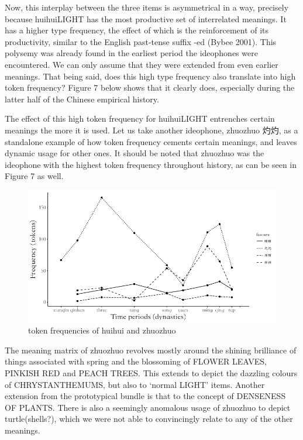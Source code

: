 Now, this interplay between the three items is asymmetrical in a way,
precisely because huihuiLIGHT has the most productive set of
interrelated meanings. It has a higher type frequency, the effect of
which is the reinforcement of its productivity, similar to the English
past-tense suffix -ed (Bybee 2001). This polysemy was already found in
the earliest period the ideophones were encountered. We can only assume
that they were extended from even earlier meanings. That being said,
does this high type frequency also translate into high token frequency?
Figure 7 below shows that it clearly does, especially during the latter
half of the Chinese empirical history.

The effect of this high token frequency for huihuiLIGHT entrenches
certain meanings the more it is used. Let us take another ideophone,
zhuozhuo 灼灼, as a standalone example of how token frequency cements
certain meanings, and leaves dynamic usage for other ones. It should be
noted that zhuozhuo was the ideophone with the highest token frequency
throughout history, as can be seen in Figure 7 as well.

\begin{figure}
\includegraphics[width=11.11in]{ideos/huihuizhuozhuo} \caption{token frequencies of huihui and zhuozhuo}\label{fig:huizhuo}
\end{figure}

The meaning matrix of zhuozhuo revolves mostly around the shining
brilliance of things associated with spring and the blossoming of FLOWER
LEAVES, PINKISH RED and PEACH TREES. This extends to depict the dazzling
colours of CHRYSTANTHEMUMS, but also to `normal LIGHT' items. Another
extension from the prototypical bundle is that to the concept of
DENSENESS OF PLANTS. There is also a seemingly anomalous usage of
zhuozhuo to depict turtle(shells?), which we were not able to
convincingly relate to any of the other meanings.

